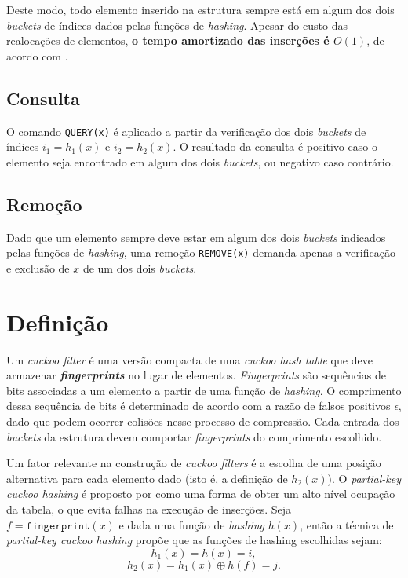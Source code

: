 \documentclass[12pt,twoside,english,brazilian]{book}
\begin{document}
Deste modo, todo elemento inserido na estrutura sempre está em algum dos dois \textit{buckets} de índices dados pelas funções de \textit{hashing}. Apesar do custo das realocações de elementos, \textbf{o tempo amortizado das inserções é $O(1)$}, de acordo com \citet{cuckoo}.

\subsection{Consulta}

O comando \texttt{QUERY(x)} é aplicado a partir da verificação dos dois \textit{buckets} de índices $i_1 = h_1(x)$ e $i_2 = h_2(x)$. O resultado da consulta é positivo caso o elemento seja encontrado em algum dos dois \textit{buckets}, ou negativo caso contrário.

\subsection{Remoção}

Dado que um elemento sempre deve estar em algum dos dois \textit{buckets} indicados pelas funções de \textit{hashing}, uma remoção \texttt{REMOVE(x)} demanda apenas a verificação e exclusão de $x$ de um dos dois \textit{buckets}.

\section{Definição}

Um \textit{cuckoo filter} é uma versão compacta de uma \textit{cuckoo hash table} que deve armazenar \textbf{\textit{fingerprints}} no lugar de elementos. \textit{Fingerprints} são sequências de bits associadas a um elemento a partir de uma função de \textit{hashing}. O comprimento dessa sequência de bits é determinado de acordo com a razão de falsos positivos $\epsilon$, dado que podem ocorrer colisões nesse processo de compressão. Cada entrada dos \textit{buckets} da estrutura devem comportar \textit{fingerprints} do comprimento escolhido.

Um fator relevante na construção de \textit{cuckoo filters} é a escolha de uma posição alternativa para cada elemento dado (isto é, a definição de $h_2(x)$). O \textit{partial-key cuckoo hashing} é proposto por \citet{cuckoo} como uma forma de obter um alto nível ocupação da tabela, o que evita falhas na execução de inserções. Seja $f= \texttt{fingerprint}(x)$ e dada uma função de \textit{hashing} $h(x)$, então a técnica de \textit{partial-key cuckoo hashing} propõe que as funções de hashing escolhidas sejam:  $$h_1(x) = h(x) = i,$$ $$h_2(x) = h_1(x) \oplus h(f) = j.$$
\end{document}
